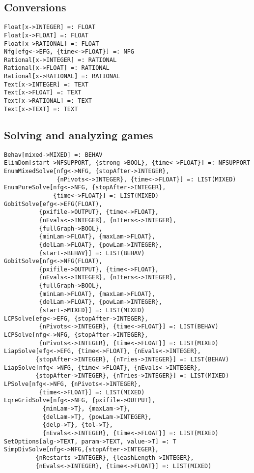 \subsection{Conversions}

\begin{verbatim}
Float[x->INTEGER] =: FLOAT
Float[x->FLOAT] =: FLOAT
Float[x->RATIONAL] =: FLOAT
Nfg[efg<->EFG, {time<->FLOAT}] =: NFG
Rational[x->INTEGER] =: RATIONAL
Rational[x->FLOAT] =: RATIONAL
Rational[x->RATIONAL] =: RATIONAL
Text[x->INTEGER] =: TEXT
Text[x->FLOAT] =: TEXT
Text[x->RATIONAL] =: TEXT
Text[x->TEXT] =: TEXT
\end{verbatim}

\subsection{Solving and analyzing games}

\begin{verbatim}
Behav[mixed->MIXED] =: BEHAV
ElimDom[start->NFSUPPORT, {strong->BOOL}, {time<->FLOAT}] =: NFSUPPORT 
EnumMixedSolve[nfg<->NFG, {stopAfter->INTEGER},
               {nPivots<->INTEGER}, {time<->FLOAT}] =: LIST(MIXED)
EnumPureSolve[nfg<->NFG, {stopAfter->INTEGER}, 
              {time<->FLOAT}] =: LIST(MIXED) 
GobitSolve[efg<->EFG(FLOAT),
          {pxifile->OUTPUT}, {time<->FLOAT},
          {nEvals<->INTEGER}, {nIters<->INTEGER},
          {fullGraph->BOOL},
          {minLam->FLOAT}, {maxLam->FLOAT}, 
          {delLam->FLOAT}, {powLam->INTEGER}, 
          {start->BEHAV}] =: LIST(BEHAV)
GobitSolve[nfg<->NFG(FLOAT),
          {pxifile->OUTPUT}, {time<->FLOAT},
          {nEvals<->INTEGER}, {nIters<->INTEGER},
          {fullGraph->BOOL},
          {minLam->FLOAT}, {maxLam->FLOAT}, 
          {delLam->FLOAT}, {powLam->INTEGER}, 
          {start->MIXED}] =: LIST(MIXED)
LCPSolve[efg<->EFG, {stopAfter->INTEGER},
          {nPivots<->INTEGER}, {time<->FLOAT}] =: LIST(BEHAV)
LCPSolve[nfg<->NFG, {stopAfter->INTEGER},
          {nPivots<->INTEGER}, {time<->FLOAT}] =: LIST(MIXED)
LiapSolve[efg<->EFG, {time<->FLOAT}, {nEvals<->INTEGER},
         {stopAfter->INTEGER}, {nTries->INTEGER}] =: LIST(BEHAV)
LiapSolve[nfg<->NFG, {time<->FLOAT}, {nEvals<->INTEGER},
         {stopAfter->INTEGER}, {nTries->INTEGER}] =: LIST(MIXED)
LPSolve[nfg<->NFG, {nPivots<->INTEGER},
          {time<->FLOAT}] =: LIST(MIXED)
LqreGridSolve[nfg<->NFG, {pxifile->OUTPUT},
           {minLam->T}, {maxLam->T}, 
           {delLam->T}, {powLam->INTEGER}, 
           {delp->T}, {tol->T},
           {nEvals<->INTEGER}, {time<->FLOAT}] =: LIST(MIXED)
SetOptions[alg->TEXT, param->TEXT, value->T] =: T
SimpDivSolve[nfg<->NFG,{stopAfter->INTEGER}, 
         {nRestarts->INTEGER}, {leashLength->INTEGER},
         {nEvals<->INTEGER}, {time<->FLOAT}] =: LIST(MIXED)
\end{verbatim}

